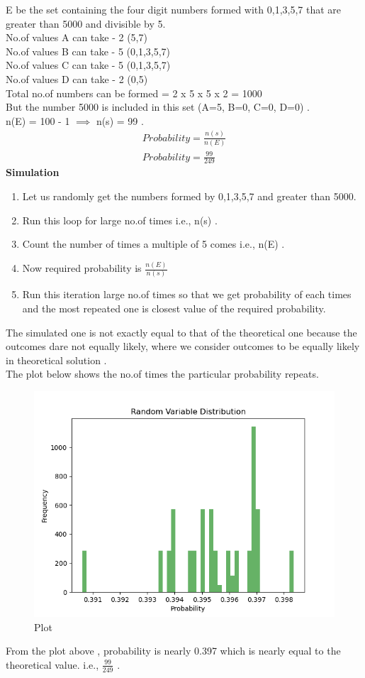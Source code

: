\documentclass[journal]{IEEEtran}
\begin{document}
E be the set containing the four digit numbers formed with 0,1,3,5,7 that are greater than 5000 and divisible by 5. \\
No.of values A can take - 2 (5,7) \\
No.of values B can take - 5 (0,1,3,5,7) \\
No.of values C can take - 5 (0,1,3,5,7) \\
No.of values D can take - 2 (0,5) \\
Total no.of numbers can be formed = 2 x 5 x 5 x 2 = 1000 \\
But the number 5000 is included in this set (A=5, B=0, C=0, D=0) . \\
n(E) = 100 - 1 $\implies$ n(s) = 99 .
\begin{align*}
Probability = \frac{n(s)}{n(E)} \\
Probability = \frac{99}{249}
\end{align*}
\textbf{Simulation} \\
\begin{enumerate}
\item Let us randomly get the numbers formed by 0,1,3,5,7 and greater than 5000. 
\item Run this loop for large no.of times i.e., n(s) .
\item Count the number of times a multiple of 5 comes i.e., n(E) .
\item Now required probability is $\frac{n(E)}{n(s)}$  
\item Run this iteration large no.of times so that we get probability of each times and the most repeated one is closest value of the required probability.
\end{enumerate}
The simulated one is not exactly equal to that of the theoretical one because the outcomes dare not equally likely, where we consider outcomes to be equally likely in theoretical solution . \\
The plot below shows the no.of times the particular probability repeats.

\begin{figure}[htbp] %
    \centering
    \includegraphics[width=\textwidth]{fig/plot.png} %
    \caption{Plot}
\end{figure}



From the plot above , probability is nearly 0.397 which is nearly equal to the theoretical value. i.e., $\frac{99}{249}$ .  
\end{document}
